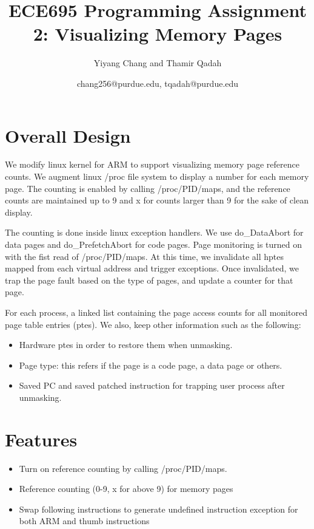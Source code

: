 \documentclass[10pt]{article}
\title{ECE695 Programming Assignment 2: Visualizing Memory Pages}
\author{Yiyang Chang and Thamir Qadah}
\date{chang256@purdue.edu, tqadah@purdue.edu}
\theoremstyle{plain} \numberwithin{equation}{section}
\theoremstyle{definition}
\newcounter{list}
\begin{document}

\maketitle

\section{Overall Design}
\vspace{-0.2in}
We modify linux kernel for ARM to support visualizing memory page reference
counts. We augment linux /proc file system to display a number for each memory
page. The counting is enabled by calling /proc/PID/maps, and the reference
counts are maintained up to 9 and x for counts larger than 9 for the sake of
clean display. 

The counting is done inside linux exception handlers. We use do\_DataAbort for
data pages and do\_PrefetchAbort for code pages. Page monitoring is turned on with
the fist read of /proc/PID/maps. At this time, we invalidate all hptes
mapped from each virtual address and trigger exceptions. Once invalidated, we
trap the page fault based on the type of pages, and update a counter for
that page. 

For each process, a linked list containing the page access counts for all monitored page 
table entries (ptes). We also, keep other information such as the following:

\vspace{-0.2in}
\begin{itemize}
	\item Hardware ptes in order to restore them when unmasking.
	\vspace{-0.1in}
	\item Page type: this refers if the page is a code page, a data page or others. 
	\vspace{-0.1in}
	\item Saved PC and saved patched instruction for trapping user process after 
	\vspace{-0.1in}
unmasking. 
	\end{itemize}


\section{Features}
\vspace{-0.2in}
\begin{itemize}
	\item Turn on reference counting by calling /proc/PID/maps. 
	\vspace{-0.1in}
	\item Reference counting (0-9, x for above 9) for memory pages
	\vspace{-0.1in}
	\item Swap following instructions to generate undefined instruction
		exception for both ARM and thumb instructions 
	\vspace{-0.1in}
	\end{itemize}
\end{document}
